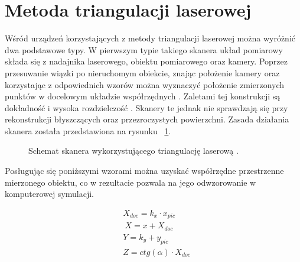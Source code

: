\section{Metoda triangulacji laserowej}
Wśród urządzeń korzystających z metody triangulacji laserowej można wyróżnić dwa podstawowe typy. W pierwszym typie takiego skanera układ pomiarowy składa się z nadajnika laserowego, obiektu pomiarowego oraz kamery. Poprzez przesuwanie wiązki po nieruchomym obiekcie, znając położenie kamery oraz korzystając z odpowiednich wzorów można wyznaczyć położenie zmierzonych punktów w docelowym układzie współrzędnych \cite{mikulski2013metody}. Zaletami tej konstrukcji są dokładność i wysoka rozdzielczość \cite{nowacki2018pomiar}. Skanery te jednak nie sprawdzają się przy rekonstrukcji błyszczących oraz przezroczystych powierzchni. Zasada działania skanera została przedstawiona na rysunku ~\ref{fig:triangPic}.

\begin{figure}[H]
  \centering
  

  \caption{Schemat skanera wykorzystującego triangulację laserową \cite{mikulski2013metody}.}   
  \label{fig:triangPic}
\end{figure}

Posługując się poniższymi wzorami można uzyskać współrzędne przestrzenne mierzonego obiektu, co w rezultacie pozwala na jego odwzorowanie w komputerowej symulacji.


    


\begin{equation}
    \begin{aligned}
        & X_{doc}=k_{x}\cdot x_{pic}\\
        & \ X=x+X_{doc} \\
      & Y=k_{y}+y_{pic} \\
      & Z=ctg(\alpha) \cdot X_{doc}\\
          
    \end{aligned}
\end{equation}

